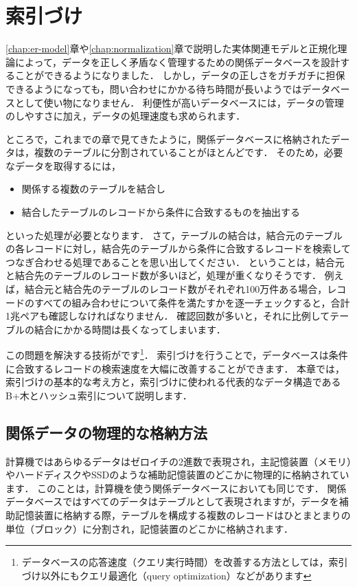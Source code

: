 \chapter{索引づけ}
\ref{chap:er-model}章や\ref{chap:normalization}章で説明した実体関連モデルと正規化理論によって，データを正しく矛盾なく管理するための関係データベースを設計することができるようになりました．
しかし，データの正しさをガチガチに担保できるようになっても，問い合わせにかかる待ち時間が長いようではデータベースとして使い物になりません．
利便性が高いデータベースには，データの管理のしやすさに加え，データの処理速度も求められます．

ところで，これまでの章で見てきたように，関係データベースに格納されたデータは，複数のテーブルに分割されていることがほとんどです．
そのため，必要なデータを取得するには，
\begin{itemize}
\item 関係する複数のテーブルを結合し
\item 結合したテーブルのレコードから条件に合致するものを抽出する
\end{itemize}
といった処理が必要となります．
さて，テーブルの結合は，結合元のテーブルの各レコードに対し，結合先のテーブルから条件に合致するレコードを検索してつなぎ合わせる処理であることを思い出してください．
ということは，結合元と結合先のテーブルのレコード数が多いほど，処理が重くなりそうです．
例えば，結合元と結合先のテーブルのレコード数がそれぞれ100万件ある場合，レコードのすべての組み合わせについて条件を満たすかを逐一チェックすると，合計1兆ペアも確認しなければなりません．
確認回数が多いと，それに比例してテーブルの結合にかかる時間は長くなってしまいます．

この問題を解決する技術がです\footnote{データベースの応答速度（クエリ実行時間）を改善する方法としては，索引づけ以外にもクエリ最適化（query optimization）などがあります}．
索引づけを行うことで，データベースは条件に合致するレコードの検索速度を大幅に改善することができます．
本章では，索引づけの基本的な考え方と，索引づけに使われる代表的なデータ構造であるB+木とハッシュ索引について説明します．


\section{関係データの物理的な格納方法}
計算機ではあらゆるデータはゼロイチの2進数で表現され，主記憶装置（メモリ）やハードディスクやSSDのような補助記憶装置のどこかに物理的に格納されています．
このことは，計算機を使う関係データベースにおいても同じです．
関係データベースではすべてのデータはテーブルとして表現されますが，データを補助記憶装置に格納する際，テーブルを構成する複数のレコードはひとまとまりの単位（ブロック）に分割され，記憶装置のどこかに格納されます．

